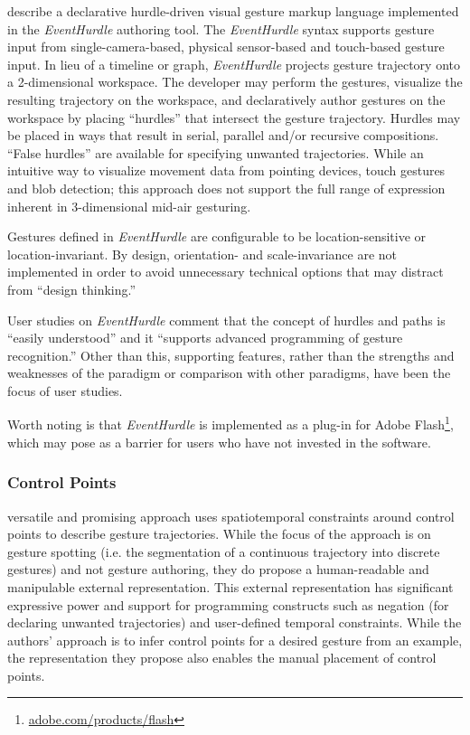 \textcite{Kim:2013} describe a declarative hurdle-driven visual gesture markup language implemented in the \emph{EventHurdle} authoring tool. The \emph{EventHurdle} syntax supports gesture input from single-camera-based, physical sensor-based and touch-based gesture input. In lieu of a timeline or graph, \emph{EventHurdle} projects gesture trajectory onto a 2-dimensional workspace. The developer may perform the gestures, visualize the resulting trajectory on the workspace, and declaratively author gestures on the workspace by placing “hurdles” that intersect the gesture trajectory. Hurdles may be placed in ways that result in serial, parallel and/or recursive compositions. “False hurdles” are available for specifying unwanted trajectories. While an intuitive way to visualize movement data from pointing devices, touch gestures and blob detection; this approach does not support the full range of expression inherent in 3-dimensional mid-air gesturing.

Gestures defined in \emph{EventHurdle} are configurable to be location-sensitive or location-invariant. By design, orientation- and scale-invariance are not implemented in order to avoid unnecessary technical options that may distract from “design thinking.”

User studies on \emph{EventHurdle} comment that the concept of hurdles and paths is “easily understood” and it “supports advanced programming of gesture recognition.” Other than this, supporting features, rather than the strengths and weaknesses of the paradigm or comparison with other paradigms, have been the focus of user studies.

Worth noting is that \emph{EventHurdle} is implemented as a plug-in for Adobe Flash\footnote{\href{http://www.adobe.com/products/flash.html}{adobe.com/products/flash}}, which may pose as a barrier for users who have not invested in the software.

\subsubsection{Control Points}

 versatile and promising approach uses spatiotemporal constraints around control points to describe gesture trajectories. While the focus of the approach is on gesture spotting (i.e. the segmentation of a continuous trajectory into discrete gestures) and not gesture authoring, they do propose a human-readable and manipulable external representation. This external representation has significant expressive power and support for programming constructs such as negation (for declaring unwanted trajectories) and user-defined temporal constraints. While the authors’ approach is to infer control points for a desired gesture from an example, the representation they propose also enables the manual placement of control points.


